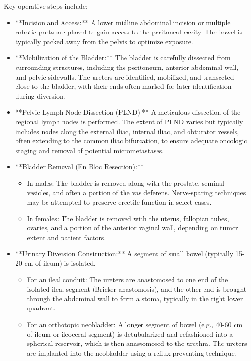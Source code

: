 Key operative steps include:

\begin{itemize}
  \item **Incision and Access:** A lower midline abdominal incision or multiple robotic ports are placed to gain access to the peritoneal cavity. The bowel is typically packed away from the pelvis to optimize exposure.
  
  \item **Mobilization of the Bladder:** The bladder is carefully dissected from surrounding structures, including the peritoneum, anterior abdominal wall, and pelvic sidewalls. The ureters are identified, mobilized, and transected close to the bladder, with their ends often marked for later identification during diversion.
  
  \item **Pelvic Lymph Node Dissection (PLND):** A meticulous dissection of the regional lymph nodes is performed. The extent of PLND varies but typically includes nodes along the external iliac, internal iliac, and obturator vessels, often extending to the common iliac bifurcation, to ensure adequate oncologic staging and removal of potential micrometastases.
  
  \item **Bladder Removal (En Bloc Resection):**
    \begin{itemize}
      \item In males: The bladder is removed along with the prostate, seminal vesicles, and often a portion of the vas deferens. Nerve-sparing techniques may be attempted to preserve erectile function in select cases.
      \item In females: The bladder is removed with the uterus, fallopian tubes, ovaries, and a portion of the anterior vaginal wall, depending on tumor extent and patient factors.
    \end{itemize}
  
  \item **Urinary Diversion Construction:** A segment of small bowel (typically 15-20 cm of ileum) is isolated.
    \begin{itemize}
      \item For an ileal conduit: The ureters are anastomosed to one end of the isolated ileal segment (Bricker anastomosis), and the other end is brought through the abdominal wall to form a stoma, typically in the right lower quadrant.
      \item For an orthotopic neobladder: A longer segment of bowel (e.g., 40-60 cm of ileum or ileocecal segment) is detubularized and refashioned into a spherical reservoir, which is then anastomosed to the urethra. The ureters are implanted into the neobladder using a reflux-preventing technique.
    \end{itemize}
  

\end{itemize}
